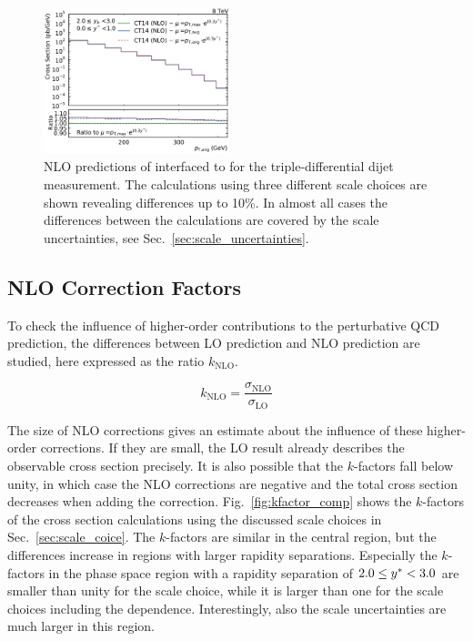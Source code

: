 \begin{figure}[htp]
    \includegraphics[width=0.48\textwidth]{figures/theory/nlo_xs_comp_yb2ys0.pdf}
    \caption[fastNLO prediction of triple-differential dijet cross section]{
        NLO predictions of \fastNLO interfaced to \NLOJETPP for the
        triple-differential dijet measurement. The calculations using three
        different scale choices are shown revealing differences up to 10\%. In
        almost all cases the differences between the calculations are covered by
        the scale uncertainties, see Sec.~\ref{sec:scale_uncertainties}.}
    \label{fig:xs_nlo_comp}
\end{figure}


\subsection{NLO Correction Factors}
\label{sec:k_factors}

To check the influence of higher-order contributions to the perturbative QCD
prediction, the differences between LO prediction and NLO
prediction are studied, here expressed as the ratio $k_\mathrm{NLO}$.

\begin{equation*}
    k_{\mathrm{NLO}} = \frac{\sigma_{\mathrm{NLO}}}{\sigma_{\mathrm{LO}}}
\end{equation*}

The size of NLO corrections gives an estimate about the influence of these
higher-order corrections. If they are small, the LO result already describes the
observable cross section precisely. It is also possible that the $k$-factors
fall below unity, in which case the NLO corrections are negative and the total cross
section decreases when adding the correction.  Fig.~\ref{fig:kfactor_comp} shows
the $k$-factors of the \NLOJETPP cross section calculations using the discussed
scale choices in Sec.~\ref{sec:scale_coice}. The $k$-factors are similar in the
central region, but the differences increase in regions with larger rapidity
separations. Especially the $k$-factors in the phase space region with a
rapidity separation of $2.0 \leq y^* < 3.0$ are smaller than unity for the
\ptavg scale choice, while it is larger than one for the scale choices including
the \ystar dependence. Interestingly, also the scale uncertainties are much
larger in this region.

